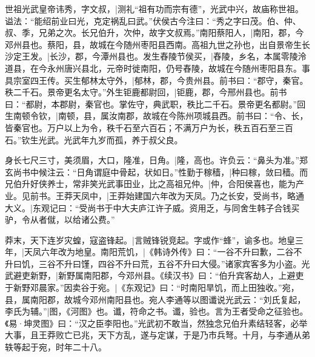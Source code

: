 \documentclass{ctexart}
\begin{document}
\setlength\parskip{30pt}


\loop
\noindent\hrulefill\par
\the\hsize\par

世祖光武皇帝讳秀，字文叔，|{测礼“{祖有功而宗有德}”，光武中兴，故庙称世祖。谥法：“能绍前业曰光，克定祸乱曰武。”伏侯古今注曰：“秀之字曰茂。伯、仲、叔、季，兄弟之次。长兄伯升，次仲，故字文叔焉。”}南阳蔡阳人，|{南阳，郡，今邓州县也。蔡阳，县，故城在今随州枣阳县西南。}高祖九世之孙也，出自景帝生长沙定王发。|{长沙，郡，今潭州县也。}发生舂陵节侯买，|{舂陵，乡名，本属零陵泠道县，在今永州唐兴县北，元帝时徙南阳，仍号舂陵，故城在今随州枣阳县东。事具宗室四王传。}买生郁林太守外，|{郁林，郡，今贵州县。前书曰：“郡守，秦官。秩二千石。景帝更名太守。”}外生钜鹿都尉回，|{钜鹿，郡，今邢州县也。前书曰：“都尉，本{郡尉}，秦官也。掌佐守，典武职，秩比二千石。景帝更名都尉。”}回生南顿令钦，|{南顿，县，属汝南郡，故城在今陈州项城县西。前书曰：“令、长，皆秦官也。万户以上为令，秩千石至六百石；不满万户为长，秩五百石至三百石。”}钦生光武。光武年九岁而孤，养于叔父良。

身长七尺三寸，美须眉，大口，隆准，日角。|{隆，高也。许负云：“鼻头为准。”郑玄尚书中候注云：“日角谓庭中骨起，状如日。”}性勤于稼穑，|{种曰稼，敛曰穑。}而兄伯升好侠养士，常非笑光武事田业，比之高祖兄仲。|{仲，合阳侯喜也，能为产业。见前书。}王莽天凤中，|{王莽始建国六年改为天凤。}乃之长安，受尚书，略通大义。|{东观记曰：“受尚书于中大夫庐江许子威。资用乏，与同舍生韩子合钱买驴，令从者僦，以给诸公费。”}

莽末，天下连岁灾蝗，寇盗锋起。|{言贼锋锐竞起。字或作“蜂”，谕多也。}地皇三年，|{天凤六年改为地皇。}南阳荒饥，|{《韩诗外传》曰：“一谷不升曰歉，二谷不升曰饥，三谷不升曰馑，四谷不升曰荒，五谷不升曰大侵。”}诸家宾客多为小盗。光武避吏新野，|{新野属南阳郡，今邓州县。《续汉书》曰：“伯升宾客劫人，上避吏于新野邓晨家。”}因卖谷于宛。|{《东观记》曰：“时南阳旱饥，而上田独收。”宛，县，属南阳郡，故城今邓州南阳县也。}宛人李通等以图谶说光武云：“刘氏复起，李氏为辅。”|{图，《河图》也。谶，符命之书。谶，验也。言为王者受命之征验也。《易·坤灵图》曰：“汉之臣李阳也。”}光武初不敢当，然独念兄伯升素结轻客，必举大事，且王莽败亡已兆，天下方乱，遂与定谋，于是乃市兵弩。十月，与李通从弟轶等起于宛，时年二十八。
\end{document}
